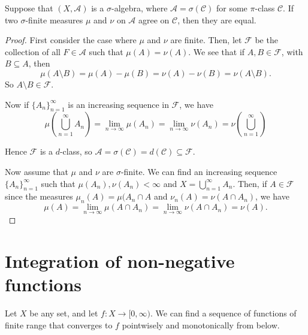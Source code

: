 \documentclass{owmaths}
\begin{document}
\begin{proposition}
    Suppose that $(X,\mathcal{A})$ is a $\sigma$-algebra, where $\mathcal{A} = \sigma(\mathcal{C})$
    for some $\pi$-class $\mathcal{C}$. If two $\sigma$-finite measures $\mu$ and $\nu$ on $\mathcal{A}$
    agree on $\mathcal{C}$, then they are equal.
\end{proposition}
\begin{proof}
    First consider the case where $\mu$ and $\nu$ are finite. Then, let $\mathcal{F}$
    be the collection of all $F \in \mathcal{A}$ such that $\mu(A) = \nu(A)$. We see
    that if $A,B \in \mathcal{F}$, with $B \subseteq A$, then 
    \begin{equation*}
        \mu(A\setminus B) = \mu(A)-\mu(B) = \nu(A)-\nu(B) = \nu(A\setminus B).
    \end{equation*}
    So $A\setminus B \in \mathcal{F}$.
    
    Now if $\{A_n\}_{n=1}^\infty$ is an increasing sequence in $\mathcal{F}$, we
    have 
    \begin{equation*}
        \mu\left(\bigcup_{n=1}^\infty A_n\right) = \lim_{n\rightarrow\infty} \mu\left(A_n\right) = \lim_{n\rightarrow\infty} \nu(A_n) = \nu\left(\bigcup_{n=1}^\infty\right)
    \end{equation*} 
    
    Hence $\mathcal{F}$ is a $d$-class, so $\mathcal{A} = \sigma(\mathcal{C}) = d(\mathcal{C}) \subseteq \mathcal{F}$.
    
    Now assume that $\mu$ and $\nu$ are $\sigma$-finite. We can find an
    increasing sequence $\{A_n\}_{n=1}^\infty$ such that $\mu(A_n),\nu(A_n) <\infty$
    and $X = \bigcup_{n=1}^\infty A_n$. Then, if $A \in \mathcal{F}$ since the
    measures $\mu_n(A) = \mu(A_n\cap A$ and $\nu_n(A) = \nu(A\cap A_n)$, we have
    \begin{equation*}
        \mu(A) = \lim_{n\rightarrow\infty} \mu(A\cap A_n) = \lim_{n\rightarrow\infty} \nu(A\cap A_n) = \nu(A).
    \end{equation*}
\end{proof}

\section{Integration of non-negative functions}
Let $X$ be any set, and let $f:X\rightarrow [0,\infty)$. We can find a sequence
of functions of finite range that converges to $f$ pointwisely and monotonically
from below.
\end{document}
